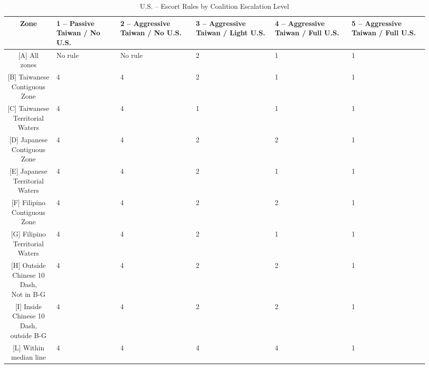 \documentclass{article}
\begin{document}
\begin{table}[H]
\centering
\begin{tabularx}{\textwidth}{|c|X|X|X|X|X|}
\hline
\textbf{Zone} & \textbf{1 -- Passive Taiwan / No U.S.} & \textbf{2 -- Aggressive Taiwan / No U.S.} & \textbf{3 -- Aggressive Taiwan / Light U.S.} & \textbf{4 -- Aggressive Taiwan / Full U.S.} & \textbf{5 -- Aggressive Taiwan / Full U.S.} \\ 
\hline
\makecell{[A] All \\ zones} & No rule & No rule & 2 & 1 & 1 \\ 
\hline
\makecell{[B] Taiwanese \\ Contiguous Zone} & 4 & 4 & 2 & 1 & 1 \\ 
\hline
\makecell{[C] Taiwanese \\ Territorial Waters} & 4 & 4 & 1 & 1 & 1 \\ 
\hline
\makecell{[D] Japanese \\ Contiguous Zone} & 4 & 4 & 2 & 2 & 1 \\ 
\hline
\makecell{[E] Japanese \\ Territorial Waters} & 4 & 4 & 2 & 1 & 1 \\ 
\hline
\makecell{[F] Filipino \\ Contiguous Zone} & 4 & 4 & 2 & 2 & 1 \\ 
\hline
\makecell{[G] Filipino \\ Territorial Waters} & 4 & 4 & 2 & 1 & 1 \\ 
\hline
\makecell{[H] Outside \\ Chinese 10 Dash, \\ Not in B-G} & 4 & 4 & 2 & 2 & 1 \\ 
\hline
\makecell{[I] Inside \\ Chinese 10 Dash, \\ outside B-G} & 4 & 4 & 2 & 2 & 1 \\ 
\hline
\makecell{[L] Within \\ median line} & 4 & 4 & 4 & 4 & 1 \\ 
\hline
\end{tabularx}
\caption{U.S. -- Escort Rules by Coalition Escalation Level}
\end{table}
\end{document}
